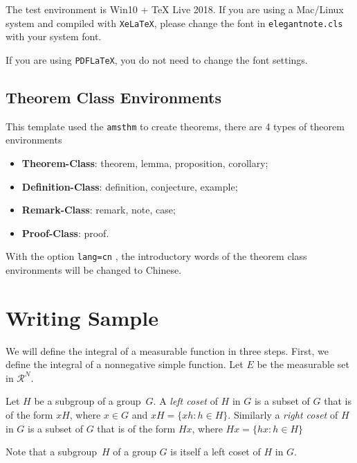 \documentclass[geye,green,pad,en]{elegantnote}
\begin{document}
The test environment is Win10 + \TeX{} Live 2018. If you are using a Mac/Linux system and compiled with \lstinline{XeLaTeX},  please change the font in \lstinline{elegantnote.cls} with your system font.

\begin{note}
If you are using \lstinline{PDFLaTeX}, you do not need to change the font settings.
\end{note}

\subsection{Theorem Class Environments}
This template used the \lstinline{amsthm} to create theorems, there are 4 types of theorem environments
\begin{itemize}
\item \textbf{Theorem-Class}: theorem, lemma, proposition, corollary;
\item \textbf{Definition-Class}: definition, conjecture, example;
\item \textbf{Remark-Class}: remark, note, case;
\item \textbf{Proof-Class}: proof.
\end{itemize}

\begin{remark}
With the option \lstinline{lang=cn} , the introductory words of the theorem class environments will be changed to Chinese.
\end{remark}

\section{Writing Sample}

We will define the integral of a measurable function in three steps. First, we define the integral of a nonnegative simple function. Let $E$ be the measurable set in $\mathcal{R}^N$.


\begin{definition}
Let $H$ be a subgroup of a group~$G$.  A \emph{left coset} of $H$ in $G$ is a subset of $G$ that is of the form $xH$, where $x \in G$ and $xH = \{ xh : h \in H \}$. Similarly a \emph{right coset} of $H$ in $G$ is a subset of $G$ that is of the form $Hx$, where $Hx = \{ hx : h \in H \}$
\end{definition}

Note that a subgroup~$H$ of a group $G$ is itself a left coset of $H$ in $G$.
\end{document}
